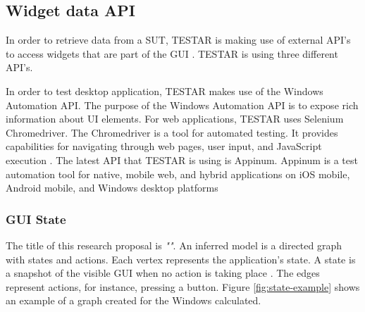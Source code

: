 \subsection{Widget data API}

In order to retrieve data from a SUT, TESTAR is making use of external API's to access widgets that are part of the GUI \cite{thesisMulders}. TESTAR is using three different API's.

In order to test desktop application, TESTAR makes use of the Windows Automation API. The purpose of the Windows Automation API is to expose rich information about UI elements\cite{win-api-info}. For web applications, TESTAR uses Selenium Chromedriver. The Chromedriver is a tool for automated testing. It provides capabilities for navigating through web pages, user input, and JavaScript execution \cite{chrome-driver-info}. The latest API that TESTAR is using is Appinum. Appinum is a test automation tool for native, mobile web, and hybrid applications on iOS mobile, Android mobile, and Windows desktop platforms \cite{apinum-info}

\subsubsection{GUI State} \label{gui-state}

The title of this research proposal is \emph{"\mytitle"}. An inferred model is a directed graph with states and actions. Each vertex represents the application's state. A state is a snapshot of the visible GUI when no action is taking place \cite{gui-history, thesisMulders}. The edges represent actions, for instance, pressing a button. Figure \ref{fig:state-example} shows an example of a graph created for the Windows calculated.


